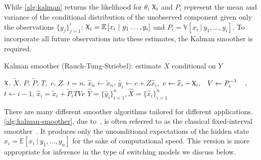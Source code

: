 \documentclass[12pt]{article}
\renewcommand{\hat}{\widehat}
\DeclareRobustCommand{\varx}{{\mathpalette\irchi\relax}}
\newcommand{\irchi}[2]{\protect\raisebox{\depth}{$#1\upchi$}}
\newcommand{\given}{\ \vert\ }
\newcommand{\E}{\mathbb{E}}
\newcommand{\Expect}[1]{\E\left[#1\right]}
\newcommand{\Var}[1]{\mathbb{V}\left[#1\right]}
\begin{document}

While \autoref{alg:kalman} returns the likelihood for $\theta$, 
$\varx_i$ and $P_i$ represent the mean and variance of the conditional distribution
of the unobserved component given only the observations
$\{y_j\}_{j=1}^i$: $\varx_i=\Expect{x_i\given y_1\ldots,y_i}$ and
$P_i=\Var{x_i\given y_1,\ldots,y_i}$. To
incorporate all future observations into these estimates, the Kalman
smoother is required.

\begin{algorithm}[t!]
  \begin{singlespace}
  \caption{Kalman smoother (Rauch-Tung-Striebel): estimate $\hat{X}$ conditional on
    $Y$\label{alg:kalman-smoother}} 
  \begin{algorithmic}
     $\varx$, $\widetilde{X}$, $P$, $\widetilde{P}$,
    $T,$ $c$, $Z$.
    \STATE $t=n$,
    \STATE $\hat{x}_{n}\leftarrow \widetilde{x}_n$, 
    \STATE $\hat{y}_i \leftarrow c + Z\hat{x}_i,$
    \STATE $\begin{aligned} e &\leftarrow \hat{x}_i -
      \varx_i, & V &\leftarrow P_i^{-1}\end{aligned}$,
    \STATE $t\leftarrow i-1$, 
    \STATE $\hat{x}_i = \widetilde{x}_i + \widetilde{P}_i T Ve $ 
    \ENDWHILE
    \RETURN $\widehat{Y}=\{\hat{y}_i\}_{i=1}^n, \hat{X}=\{\hat{x}_i\}_{i=1}^n$
  \end{algorithmic}
\end{singlespace}
\end{algorithm}

There are many different smoother algorithms tailored for different
applications. \autoref{alg:kalman-smoother}, due
to~\citet{RauchStriebel1965}, is often referred to as the classical
fixed-interval smoother~\citep{AndersonMoore1979}. It produces only
the unconditional expectations of the hidden state
$\hat{x}_i=\Expect{x_i\given y_1,\ldots,y_n}$ for the sake of
computational speed. This version is more appropriate for inference in
the type of switching models we discuss below.
\end{document}
